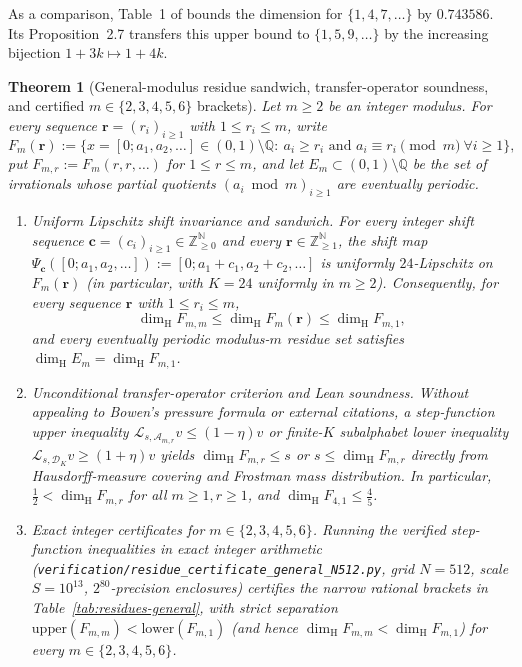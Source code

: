 \documentclass[11pt]{article}
\newtheorem{theorem}{Theorem}
\theoremstyle{definition}
\theoremstyle{remark}
\newcommand{\Z}{\mathbb{Z}}
\newcommand{\N}{\mathbb{N}}
\newcommand{\Q}{\mathbb{Q}}
\newcommand{\dimH}{\dim_{\mathrm{H}}}
\begin{document}
As a comparison, Table~1 of \cite{CLU} bounds the dimension for
$\{1,4,7,\ldots\}$ by $0.743586$. Its Proposition~2.7 transfers this upper bound
to $\{1,5,9,\ldots\}$ by the increasing bijection $1+3k\mapsto 1+4k$.

\begin{theorem}[General-modulus residue sandwich, transfer-operator soundness, and certified $m\in\{2,3,4,5,6\}$ brackets]\label{thm:residues-general}
Let $m\ge2$ be an integer modulus. For every sequence $\mathbf r=(r_i)_{i\ge1}$
with $1\le r_i\le m$, write
\[
F_m(\mathbf r)
:=\bigl\{x=[0;a_1,a_2,\dots]\in(0,1)\setminus\Q:\ a_i\ge r_i\text{ and }a_i\equiv r_i\pmod m\ \forall i\ge1\bigr\},
\]
put $F_{m,r}:=F_m(r,r,\dots)$ for $1\le r\le m$, and let $E_m\subset(0,1)\setminus\Q$
be the set of irrationals whose partial quotients $(a_i\bmod m)_{i\ge1}$ are
eventually periodic.
\begin{enumerate}[label=\textup{(\roman*)},leftmargin=2.2em]
\item \emph{Uniform Lipschitz shift invariance and sandwich.}
For every integer shift sequence $\mathbf c=(c_i)_{i\ge1}\in\Z_{\ge0}^{\N}$ and every
$\mathbf r\in\Z_{\ge1}^{\N}$, the shift map $\Psi_{\mathbf c}([0;a_1,a_2,\dots]):=[0;a_1+c_1,a_2+c_2,\dots]$
is uniformly $24$-Lipschitz on $F_m(\mathbf r)$ (in particular, with $K=24$
uniformly in $m\ge2$). Consequently, for every sequence $\mathbf r$ with
$1\le r_i\le m$,
\[
\dimH F_{m,m}\le \dimH F_m(\mathbf r)\le \dimH F_{m,1},
\]
and every eventually periodic modulus-$m$ residue set satisfies $\dimH E_m=\dimH F_{m,1}$.
\item \emph{Unconditional transfer-operator criterion and Lean soundness.}
Without appealing to Bowen's pressure formula or external \cite{CLU} citations,
a step-function upper inequality $\mathcal L_{s,\mathcal A_{m,r}}v\le(1-\eta)v$
or finite-$K$ subalphabet lower inequality $\mathcal L_{s,\mathcal D_K}v\ge(1+\eta)v$
yields $\dimH F_{m,r}\le s$ or $s\le\dimH F_{m,r}$ directly from
Hausdorff-measure covering and Frostman mass distribution. In particular,
$\frac12<\dimH F_{m,r}$ for all $m\ge1,r\ge1$, and $\dimH F_{4,1}\le\frac45$.
\item \emph{Exact integer certificates for $m\in\{2,3,4,5,6\}$.}
Running the verified step-function inequalities in exact integer arithmetic
(\texttt{verification/\allowbreak residue\_\allowbreak certificate\_\allowbreak general\_\allowbreak N512.py},
grid $N=512$, scale $S=10^{13}$, $2^{80}$-precision enclosures) certifies the
narrow rational brackets in Table~\ref{tab:residues-general}, with strict
separation $\mathrm{upper}(F_{m,m})<\mathrm{lower}(F_{m,1})$ (and hence
$\dimH F_{m,m}<\dimH F_{m,1}$) for every $m\in\{2,3,4,5,6\}$.
\end{enumerate}
\end{theorem}
\end{document}
